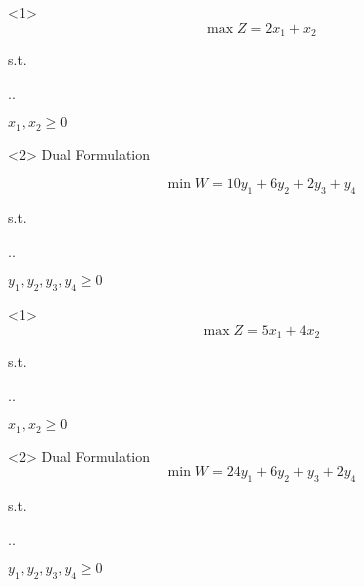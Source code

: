 \begin{frameExample}{}{}
  \begin{onlyenv}<1>
      \[ \max Z = 2x_1 + x_2 \]
      {\centering
      s.t.%
\vspace{4mm}
      
        \sysdelim..%

      \vspace{5mm}
      $x_1, x_2 \geq 0$
      \par}
  \end{onlyenv}

  \begin{onlyenv}<2>
    Dual Formulation
    
      \[ \min W = 10y_1 + 6y_2 + 2y_3 + y_4\]
      {\centering
      s.t.%
\vspace{4mm}
      
        \sysdelim..%

      \vspace{5mm}
      $y_1, y_2, y_3, y_4 \geq 0$
      \par}
  \end{onlyenv}
\end{frameExample}


\begin{frameExample}{}{}
  \begin{onlyenv}<1>
      \[ \max Z = 5x_1 + 4x_2 \]
      {\centering
      s.t.%
\vspace{4mm}
      
        \sysdelim..%

      \vspace{5mm}
      $x_1, x_2 \geq 0$
      \par}
  \end{onlyenv}
  \begin{onlyenv}<2>
    Dual Formulation
      \[ \min W = 24y_1 + 6y_2 + y_3 + 2y_4 \]
      {\centering
      s.t.%
\vspace{4mm}
      
        \sysdelim..%

      \vspace{5mm}
      $y_1, y_2, y_3, y_4 \geq 0$
      \par}
  \end{onlyenv}
\end{frameExample}
  
